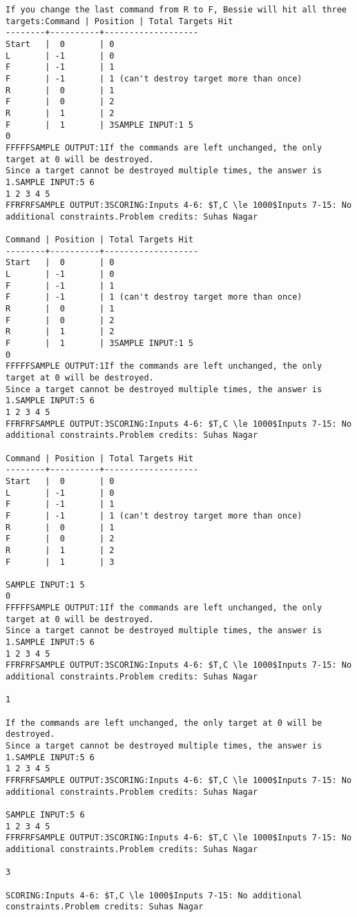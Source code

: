 \documentclass[12pt]{article}
\begin{document}
\begin{verbatim}
If you change the last command from R to F, Bessie will hit all three targets:Command | Position | Total Targets Hit
--------+----------+-------------------
Start   |  0       | 0 
L       | -1       | 0
F       | -1       | 1
F       | -1       | 1 (can't destroy target more than once)
R       |  0       | 1
F       |  0       | 2
R       |  1       | 2
F       |  1       | 3SAMPLE INPUT:1 5
0
FFFFFSAMPLE OUTPUT:1If the commands are left unchanged, the only target at 0 will be destroyed.
Since a target cannot be destroyed multiple times, the answer is 1.SAMPLE INPUT:5 6
1 2 3 4 5
FFRFRFSAMPLE OUTPUT:3SCORING:Inputs 4-6: $T,C \le 1000$Inputs 7-15: No additional constraints.Problem credits: Suhas Nagar

Command | Position | Total Targets Hit
--------+----------+-------------------
Start   |  0       | 0 
L       | -1       | 0
F       | -1       | 1
F       | -1       | 1 (can't destroy target more than once)
R       |  0       | 1
F       |  0       | 2
R       |  1       | 2
F       |  1       | 3SAMPLE INPUT:1 5
0
FFFFFSAMPLE OUTPUT:1If the commands are left unchanged, the only target at 0 will be destroyed.
Since a target cannot be destroyed multiple times, the answer is 1.SAMPLE INPUT:5 6
1 2 3 4 5
FFRFRFSAMPLE OUTPUT:3SCORING:Inputs 4-6: $T,C \le 1000$Inputs 7-15: No additional constraints.Problem credits: Suhas Nagar

Command | Position | Total Targets Hit
--------+----------+-------------------
Start   |  0       | 0 
L       | -1       | 0
F       | -1       | 1
F       | -1       | 1 (can't destroy target more than once)
R       |  0       | 1
F       |  0       | 2
R       |  1       | 2
F       |  1       | 3

SAMPLE INPUT:1 5
0
FFFFFSAMPLE OUTPUT:1If the commands are left unchanged, the only target at 0 will be destroyed.
Since a target cannot be destroyed multiple times, the answer is 1.SAMPLE INPUT:5 6
1 2 3 4 5
FFRFRFSAMPLE OUTPUT:3SCORING:Inputs 4-6: $T,C \le 1000$Inputs 7-15: No additional constraints.Problem credits: Suhas Nagar

1

If the commands are left unchanged, the only target at 0 will be destroyed.
Since a target cannot be destroyed multiple times, the answer is 1.SAMPLE INPUT:5 6
1 2 3 4 5
FFRFRFSAMPLE OUTPUT:3SCORING:Inputs 4-6: $T,C \le 1000$Inputs 7-15: No additional constraints.Problem credits: Suhas Nagar

SAMPLE INPUT:5 6
1 2 3 4 5
FFRFRFSAMPLE OUTPUT:3SCORING:Inputs 4-6: $T,C \le 1000$Inputs 7-15: No additional constraints.Problem credits: Suhas Nagar

3

SCORING:Inputs 4-6: $T,C \le 1000$Inputs 7-15: No additional constraints.Problem credits: Suhas Nagar
\end{verbatim}
\end{document}
